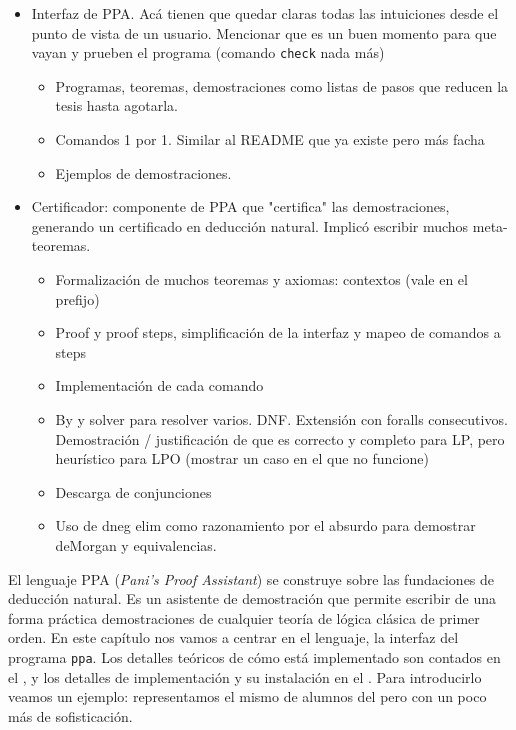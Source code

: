 \begin{itemize}
    \item Interfaz de PPA. Acá tienen que quedar claras todas las intuiciones
    desde el punto de vista de un usuario. Mencionar que es un buen momento para
    que vayan y prueben el programa (comando \texttt{check} nada más) \ok
    \begin{itemize}
        \item Programas, teoremas, demostraciones como listas de pasos que
        reducen la tesis hasta agotarla. \ok
        \item Comandos 1 por 1. Similar al README que ya existe pero más facha \ok
        \item Ejemplos de demostraciones. \ok
    \end{itemize}
    \item Certificador: componente de PPA que "certifica" las demostraciones,
    generando un certificado en deducción natural. Implicó escribir muchos
    meta-teoremas.
    \begin{itemize}
        \item Formalización de muchos teoremas y axiomas: contextos (vale en el prefijo)
        \item Proof y proof steps, simplificación de la interfaz y mapeo de
        comandos a steps
        \item Implementación de cada comando
        \item By y solver para resolver varios. DNF. Extensión con foralls
        consecutivos. Demostración / justificación de que es correcto y completo
        para LP, pero heurístico para LPO (mostrar un caso en el que no funcione)
        \item Descarga de conjunciones
        \item Uso de dneg elim como razonamiento por el absurdo para demostrar
        deMorgan y equivalencias.
    \end{itemize}
\end{itemize}

El lenguaje PPA (\textit{Pani's Proof Assistant}) se construye sobre las
fundaciones de deducción natural. Es un asistente de demostración que permite
escribir de una forma práctica demostraciones de cualquier teoría de lógica
clásica de primer orden. En este capítulo nos vamos a centrar en el lenguaje, la
interfaz del programa \texttt{ppa}. Los detalles teóricos de cómo está
implementado son contados en el , y los detalles de
implementación y su instalación en el . Para
introducirlo veamos un ejemplo: representamos el mismo de alumnos del
 pero con un poco más de
sofisticación.

